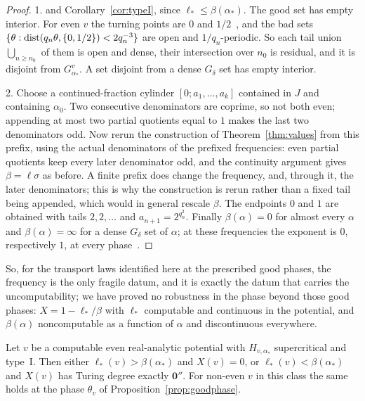 \begin{proof}
1. \cite[Theorem~A]{DMuniv} and Corollary~\ref{cor:typeI}, since $\ell_*\le\beta(\alpha_*)$. The good set has empty interior. For even $v$ the turning points are $0$ and $1/2$~\cite[Lemma~5.22]{DMuniv}, and the bad sets $\{\theta:\operatorname{dist}(q_n\theta,\{0,1/2\})<2q_n^{-3}\}$ are open and $1/q_n$-periodic. So each tail union $\bigcup_{n\ge n_0}$ of them is open and dense, their intersection over $n_0$ is residual, and it is disjoint from $G^v_{\alpha_*}$. A set disjoint from a dense $G_\delta$ set has empty interior.

2. Choose a continued-fraction cylinder $[0;a_1,\dots,a_k]$ contained in $J$ and containing $\alpha_0$. Two consecutive denominators are coprime, so not both even; appending at most two partial quotients equal to $1$ makes the last two denominators odd. Now rerun the construction of Theorem~\ref{thm:values} from this prefix, using the actual denominators of the prefixed frequencies: even partial quotients keep every later denominator odd, and the continuity argument gives $\beta=\ell\sigma$ as before. A finite prefix does change the frequency, and, through it, the later denominators; this is why the construction is rerun rather than a fixed tail being appended, which would in general rescale $\beta$. The endpoints $0$ and $1$ are obtained with tails $2,2,\dots$ and $a_{n+1}=2^{q_n^2}$. Finally $\beta(\alpha)=0$ for almost every $\alpha$ and $\beta(\alpha)=\infty$ for a dense $G_\delta$ set of $\alpha$; at these frequencies the exponent is $0$, respectively $1$, at every phase~\cite[Theorem~A]{DMuniv}.
\end{proof}

So, for the transport laws identified here at the prescribed good phases, the frequency is the only fragile datum, and it is exactly the datum that carries the uncomputability; we have proved no robustness in the phase beyond those good phases: $X=1-\ell_*/\beta$ with $\ell_*$ computable and continuous in the potential, and $\beta(\alpha)$ noncomputable as a function of $\alpha$ and discontinuous everywhere.

\begin{theorem}[A dichotomy]\label{thm:dichotomy}
Let $v$ be a computable even real-analytic potential with $H_{v,\alpha_*}$ supercritical and type~I. Then either $\ell_*(v)>\beta(\alpha_*)$ and $X(v)=0$, or $\ell_*(v)<\beta(\alpha_*)$ and $X(v)$ has Turing degree exactly $\mathbf 0''$. For non-even $v$ in this class the same holds at the phase $\theta_v$ of Proposition~\ref{prop:goodphase}.
\end{theorem}

